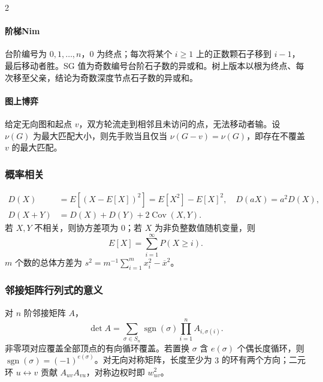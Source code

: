 \begin{footnotesize}
\begin{multicols}{2}
\paragraph{阶梯Nim}台阶编号为 $0,1,\dots,n$，$0$ 为终点；每次将某个 $i\ge1$ 上的正数颗石子移到 $i-1$，最后移动者胜。SG 值为奇数编号台阶石子数的异或和。树上版本以根为终点、每次移至父亲，结论为奇数深度节点石子数的异或和。
\paragraph{图上博弈}给定无向图和起点 $v$，双方轮流走到相邻且未访问的点，无法移动者输。设 $\nu(G)$ 为最大匹配大小，则先手败当且仅当 $\nu(G-v)=\nu(G)$，即存在不覆盖 $v$ 的最大匹配。
\end{multicols}


\subsubsection{概率相关}
\[\begin{aligned}
D(X)&=E[(X-E[X])^2]=E[X^2]-E[X]^2,\quad D(aX)=a^2D(X),\\
D(X+Y)&=D(X)+D(Y)+2\operatorname{Cov}(X,Y).
\end{aligned}\]
若 $X,Y$ 不相关，则协方差项为 $0$；若 $X$ 为非负整数值随机变量，则
\[E[X]=\sum_{i=1}^{\infty}P(X\ge i).\]
$m$ 个数的总体方差为 $s^2=m^{-1}\sum_{i=1}^m x_i^2-\overline x^2$。

\subsubsection{邻接矩阵行列式的意义}
对 $n$ 阶邻接矩阵 $A$，
\[\det A=\sum_{\sigma\in S_n}\operatorname{sgn}(\sigma)
\prod_{i=1}^n A_{i,\sigma(i)}.\]
非零项对应覆盖全部顶点的有向循环覆盖。若置换 $\sigma$ 含 $e(\sigma)$ 个偶长度循环，则 $\operatorname{sgn}(\sigma)=(-1)^{e(\sigma)}$。对无向对称矩阵，长度至少为 $3$ 的环有两个方向；二元环 $u\leftrightarrow v$ 贡献 $A_{uv}A_{vu}$，对称边权时即 $w_{uv}^2$。


\end{footnotesize}
